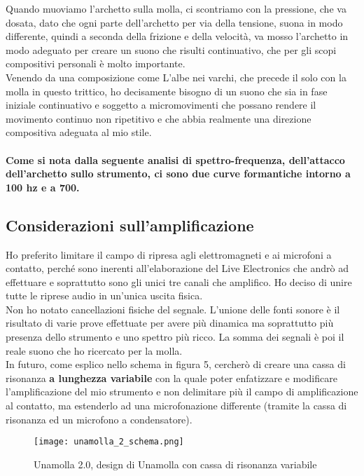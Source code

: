 Quando muoviamo l’archetto sulla molla, ci scontriamo con la pressione, che va dosata, dato che ogni parte dell’archetto per via della tensione, suona in modo differente, quindi a seconda della frizione e della velocità, va mosso l’archetto in modo adeguato per creare un suono che risulti continuativo, che per gli scopi compositivi personali è molto importante. \\
Venendo da una composizione come L’albe nei varchi, che precede il solo con la molla in questo trittico, ho decisamente bisogno di un suono che sia in fase iniziale continuativo e soggetto a micromovimenti che possano rendere il movimento continuo non ripetitivo e che abbia realmente una direzione compositiva adeguata al mio stile. 
\\ \\
\textbf{Come si nota dalla seguente analisi di spettro-frequenza, dell’attacco dell’archetto sullo strumento, ci sono due curve formantiche intorno a 100 hz e a 700.} 

\subsection{Considerazioni sull’amplificazione}

Ho preferito limitare il campo di ripresa agli elettromagneti e ai microfoni a contatto, perché sono inerenti all’elaborazione del Live Electronics che andrò ad effettuare e soprattutto sono gli unici tre canali che amplifico. Ho deciso di unire tutte le riprese audio in un’unica uscita fisica. \\
Non ho notato cancellazioni fisiche del segnale. L’unione delle fonti sonore è il risultato di varie prove effettuate per avere più dinamica ma soprattutto più presenza dello strumento e uno spettro più ricco. La somma dei segnali è poi il reale suono che ho ricercato per la molla. \\
In futuro, come esplico nello schema in figura 5, cercherò di creare una cassa di risonanza \textbf{a lunghezza variabile} con la quale poter enfatizzare e modificare l’amplificazione del mio strumento e non delimitare più il campo di amplificazione al contatto, ma estenderlo ad una microfonazione differente (tramite la cassa di risonanza ed un microfono a condensatore).
\begin{figure}

\begin{center}

\texttt{[image: unamolla\_2\_schema.png]}

\caption{Unamolla 2.0, design di Unamolla con cassa di risonanza variabile}

\label{fig:05_unamolla_2.0}

\end{center}

\end{figure}



